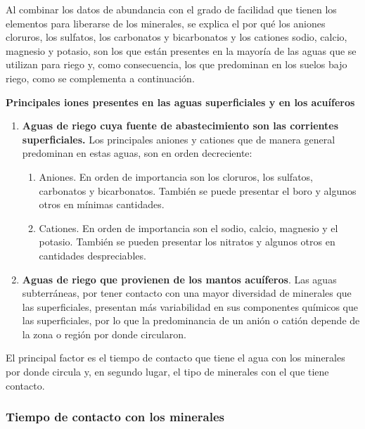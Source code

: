 Al combinar los datos de abundancia con el grado de facilidad que tienen los elementos para liberarse de los minerales, se explica el por qué los aniones cloruros, los sulfatos, los carbonatos y bicarbonatos y los cationes sodio, calcio, magnesio y potasio, son los que están presentes en la mayoría de las aguas que se utilizan para riego y, como consecuencia, los que predominan en los suelos bajo riego, como se complementa a continuación.

\textbf{Principales iones presentes en las aguas superficiales y en los acuíferos}
\begin{enumerate}
  \item \textbf{Aguas de riego cuya fuente de abastecimiento son las corrientes
  superficiales.} Los principales aniones y cationes que de manera general
  predominan en estas aguas, son en orden decreciente: \begin{enumerate}
    \item Aniones. En orden de importancia son los cloruros, los sulfatos, carbonatos y bicarbonatos. También se puede presentar el boro y algunos otros en mínimas cantidades.
    \item Cationes. En orden de importancia son el sodio, calcio, magnesio y el potasio. También se pueden presentar los nitratos y algunos otros en cantidades despreciables.
  \end{enumerate}
  \item \textbf{Aguas de riego que provienen de los mantos acuíferos}. Las aguas subterráneas, por tener contacto con una mayor diversidad de minerales que las superficiales, presentan más variabilidad en sus componentes químicos que las superficiales, por lo que la predominancia de un anión o catión depende de la zona o región por donde circularon.
\end{enumerate}
El principal factor es el tiempo de contacto que tiene el agua con los minerales por donde circula y, en segundo lugar, el tipo de minerales con el que tiene contacto.

\subsubsection{Tiempo de contacto con los minerales}

